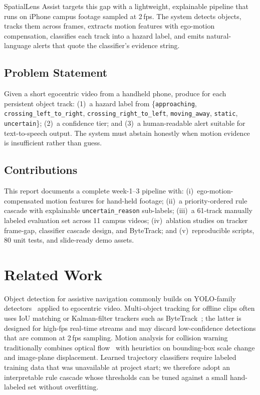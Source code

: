 \documentclass[10pt,twocolumn,letterpaper]{article}
\begin{document}
SpatialLens Assist targets this gap with a lightweight, explainable pipeline that runs on iPhone campus footage sampled at 2\,fps. The system detects objects, tracks them across frames, extracts motion features with ego-motion compensation, classifies each track into a hazard label, and emits natural-language alerts that quote the classifier's evidence string.

\subsection{Problem Statement}

Given a short egocentric video from a handheld phone, produce for each persistent object track:
(1)~a hazard label from
\{\texttt{approaching}, \texttt{crossing\_left\_to\_right}, \texttt{crossing\_right\_to\_left}, \texttt{moving\_away}, \texttt{static}, \texttt{uncertain}\};
(2)~a confidence tier; and
(3)~a human-readable alert suitable for text-to-speech output.
The system must abstain honestly when motion evidence is insufficient rather than guess.

\subsection{Contributions}

This report documents a complete week-1--3 pipeline with:
(i)~ego-motion-compensated motion features for hand-held footage;
(ii)~a priority-ordered rule cascade with explainable \texttt{uncertain\_reason} sub-labels;
(iii)~a 61-track manually labeled evaluation set across 11 campus videos;
(iv)~ablation studies on tracker frame-gap, classifier cascade design, and ByteTrack; and
(v)~reproducible scripts, 80 unit tests, and slide-ready demo assets.

\section{Related Work}

Object detection for assistive navigation commonly builds on YOLO-family detectors~\cite{yolo} applied to egocentric video. Multi-object tracking for offline clips often uses IoU matching or Kalman-filter trackers such as ByteTrack~\cite{bytetrack}; the latter is designed for high-fps real-time streams and may discard low-confidence detections that are common at 2\,fps sampling. Motion analysis for collision warning traditionally combines optical flow~\cite{farneback} with heuristics on bounding-box scale change and image-plane displacement. Learned trajectory classifiers require labeled training data that was unavailable at project start; we therefore adopt an interpretable rule cascade whose thresholds can be tuned against a small hand-labeled set without overfitting.
\end{document}
